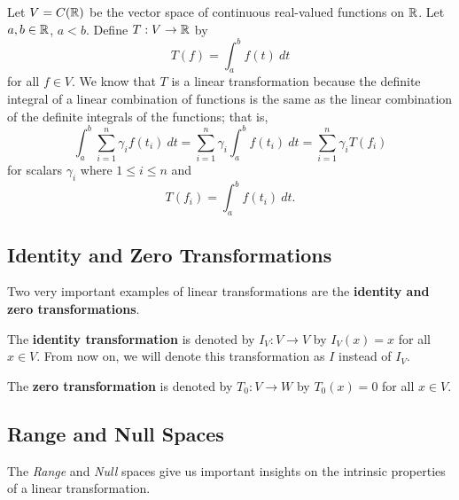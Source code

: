 \begin{eg}[Integrals]\label{Integrals are Linear}
    Let \( V = C(\mathbb{R}) \) be the vector space of continuous real-valued functions on \( \mathbb{R} \). Let \( a,b \in \mathbb{R}  \), \( a < b  \). Define \( T: V \to \mathbb{R}  \) by
    \[  T(f) = \int_{ a }^{ b }  f(t) \ dt  \] for all \( f \in V  \). We know that \( T  \) is a linear transformation because the definite integral of a linear combination of functions is the same as the linear combination of the definite integrals of the functions; that is, 
    \[  \int_{ a }^{ b } \sum_{ i=1 }^{ n } \gamma_{i} f(t_{i}) \ dt = \sum_{ i=1 }^{ n } \gamma_{i} \int_{ a }^{ b } f(t_{i})   \ dt = \sum_{ i=1 }^{ n } \gamma_{i} T(f_i)  \]
    for scalars \( \gamma_{i}  \) where \( 1 \leq i \leq n\) and  
    \[  T(f_i) =  \int_{ a }^{ b } f(t_{i}) \ dt.  \]
\end{eg}


\subsection{Identity and Zero Transformations}

\begin{remark}
   Two very important examples of linear transformations are the \textbf{identity and zero transformations}. 
\end{remark}

\begin{definition}\label{Identity Transformation}
    The \textbf{identity transformation} is denoted by \( I_{V}: V \to V  \) by \( I_{V}(x) = x  \) for all \( x \in V  \). From now on, we will denote this transformation as \( I  \) instead of \( I_{V} \).
\end{definition}

\begin{definition}\label{Zero Transformation}
    The \textbf{zero transformation} is denoted by \( T_{0}: V \to W  \) by \( T_{0}(x) = 0  \) for all \( x \in V  \).
\end{definition}

\subsection{Range and Null Spaces}

The \textit{Range} and \textit{Null} spaces give us important insights on the intrinsic properties of a linear transformation.



